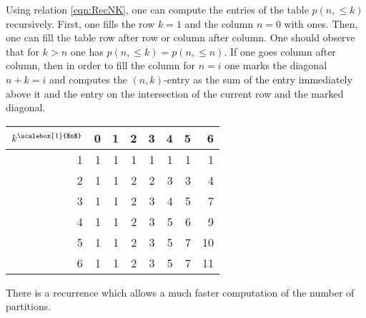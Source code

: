 

\setcounter{section}{3}
\setcounter{subsection}{7}
\setcounter{dfn}{18}



Using relation \eqref{eqn:RecNK}, one can compute the entries of the table $p(n, \le k)$ recursively.
First, one fills the row $k=1$ and the column $n=0$ with ones.
Then, one can fill the table row after row or column after column.
One should observe that for $k > n$ one has $p(n, \le k) = p(n, \le n)$.
If one goes column after column, then in order to fill the column for $n = i$
one marks the diagonal $n+k = i$ and computes the $(n,k)$-entry as the sum of the entry immediately above it
and the entry on the intersection of the current row and the marked diagonal.

\begin{center}
\begin{tabular}{r|rrrrrrr}
$k^{\scalebox{1}{$n$}}$\hspace{-.2cm} & 0 & 1 & 2 & 3 & 4 & 5 & 6\\
\hline
1 & 1 & 1 & 1 & 1 & 1 & 1 & 1\\
2 & 1 & 1 & 2 & 2 & 3 & 3 & 4\\
3 & 1 & 1 & 2 & 3 & 4 & 5 & 7\\
4 & 1 & 1 & 2 & 3 & 5 & 6 & 9\\
5 & 1 & 1 & 2 & 3 & 5 & 7 & 10\\
6 & 1 & 1 & 2 & 3 & 5 & 7 & 11
\end{tabular}
\end{center}

There is a recurrence which allows a much faster computation of the number of partitions.



